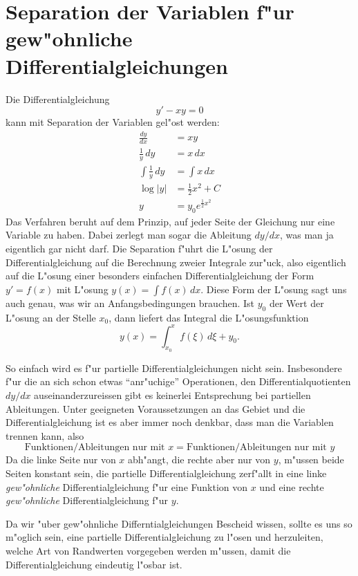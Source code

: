 \section{Separation der Variablen f"ur gew"ohnliche Differentialgleichungen}
Die Differentialgleichung 
\begin{equation}
y'-xy=0
\label{separation:ode}
\end{equation}
kann mit Separation der Variablen gel"ost werden:
\begin{align*}
\frac{dy}{dx}&=xy\\
\frac1y\,dy&=x\,dx\\
\int\frac1y\,dy&=\int x\,dx\\
\log|y|&=\frac12x^2+C\\
y&=y_0e^{\frac12x^2}
\end{align*}
Das Verfahren beruht auf dem Prinzip, auf jeder Seite der Gleichung
nur eine Variable zu haben.
Dabei zerlegt man sogar die Ableitung $dy/dx$, was man ja eigentlich
gar nicht darf.
Die Separation f"uhrt die L"osung der Differentialgleichung auf die
Berechnung zweier Integrale zur"uck, also eigentlich auf die
L"osung einer besonders einfachen Differentialgleichung der Form $y'=f(x)$
mit L"osung $y(x)=\int f(x)\,dx$.
Diese Form der L"osung sagt uns auch genau, was wir an Anfangsbedingungen
brauchen.
Ist $y_0$ der Wert der L"osung an der Stelle $x_0$, dann liefert
das Integral die L"osungsfunktion
\[
y(x)=\int_{x_0}^xf(\xi)\,d\xi + y_0.
\]

So einfach wird es f"ur partielle Differentialgleichungen nicht sein.
Insbesondere f"ur die an sich schon etwas ``anr"uchige'' Operationen,
den Differentialquotienten $dy/dx$ auseinanderzureissen gibt es keinerlei
Entsprechung bei partiellen Ableitungen.
Unter geeigneten Voraussetzungen an das Gebiet und die Differentialgleichung
ist es aber immer noch denkbar, dass man die Variablen trennen kann,
also 
\[
\text{Funktionen/Ableitungen nur mit $x$} = \text{Funktionen/Ableitungen nur mit $y$}
\]
Da die linke Seite nur von $x$ abh"angt, die rechte aber nur von $y$, m"ussen
beide Seiten konstant sein, die partielle Differentialgleichung zerf"allt
in eine linke {\em gew"ohnliche} Differentialgleichung f"ur eine Funktion von
$x$ und eine rechte {\em gew"ohnliche} Differentialgleichung f"ur $y$.

Da wir "uber gew"ohnliche Differntialgleichungen Bescheid wissen, sollte
es uns so m"oglich sein, eine partielle Differentialgleichung zu l"osen
und herzuleiten, welche Art von Randwerten vorgegeben werden m"ussen, damit
die Differentialgleichung eindeutig l"osbar ist.

